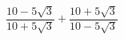 \begin{ex}[type=expression]
	\begin{condition}
		\( \dfrac{10-5\sqrt{3}}{10+5\sqrt{3}}+\dfrac{10+5\sqrt{3}}{10-5\sqrt{3}} \)
	\end{condition}
\end{ex}